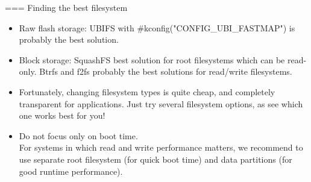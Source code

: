 === Finding the best filesystem
\begin{itemize}
\item Raw flash storage: UBIFS with #kconfig("CONFIG_UBI_FASTMAP") is
      probably the best solution.
\item Block storage: SquashFS best solution for root filesystems
      which can be read-only. Btrfs and f2fs probably the best solutions
      for read/write filesystems.
\item Fortunately, changing filesystem types is quite cheap,
      and completely transparent for applications. Just try
      several filesystem options, as see which one works best
      for you!
\item Do not focus only on boot time. \\
      For systems in which read and write performance matters, we
      recommend to use separate root filesystem (for quick
      boot time) and data partitions (for good runtime performance).
\end{itemize}

